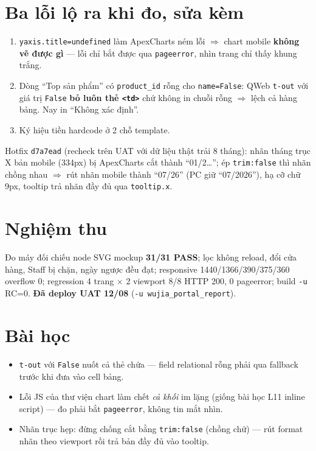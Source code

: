 \section{Ba lỗi lộ ra khi đo, sửa kèm}

\begin{enumerate}
\item \texttt{yaxis.title=undefined} làm ApexCharts ném lỗi $\Rightarrow$ chart mobile
  \textbf{không vẽ được gì} --- lỗi chỉ bắt được qua \texttt{pageerror}, nhìn trang chỉ thấy
  khung trắng.
\item Dòng ``Top sản phẩm'' có \texttt{product\_id} rỗng cho \texttt{name=False}: QWeb
  \texttt{t-out} với giá trị \texttt{False} \textbf{bỏ luôn thẻ \texttt{<td>}} chứ không in
  chuỗi rỗng $\Rightarrow$ lệch cả hàng bảng. Nay in ``Không xác định''.
\item Ký hiệu tiền hardcode ở 2 chỗ template.
\end{enumerate}

Hotfix \texttt{d7a7ead} (recheck trên UAT với dữ liệu thật trải 8 tháng): nhãn tháng trục X
bản mobile (334px) bị ApexCharts cắt thành ``01/2\ldots''; ép \texttt{trim:false} thì nhãn
chồng nhau $\Rightarrow$ rút nhãn mobile thành ``07/26'' (PC giữ ``07/2026''), hạ cỡ chữ 9px,
tooltip trả nhãn đầy đủ qua \texttt{tooltip.x}.

\section{Nghiệm thu}

Đo máy đối chiếu node SVG mockup \textbf{31/31 PASS}; lọc không reload, đổi cửa hàng, Staff bị
chặn, ngày ngược đều đạt; responsive 1440/1366/390/375/360 overflow 0; regression 4 trang
$\times$ 2 viewport 8/8 HTTP 200, 0 pageerror; build \texttt{-u} RC=0. \textbf{Đã deploy UAT
12/08} (\texttt{-u wujia\_portal\_report}).

\section{Bài học}

\begin{itemize}
\item \texttt{t-out} với \texttt{False} nuốt cả thẻ chứa --- field relational rỗng phải qua
  fallback trước khi đưa vào cell bảng.
\item Lỗi JS của thư viện chart làm chết \emph{cả khối} im lặng (giống bài học L11 inline
  script) --- đo phải bắt \texttt{pageerror}, không tin mắt nhìn.
\item Nhãn trục hẹp: đừng chống cắt bằng \texttt{trim:false} (chồng chữ) --- rút format nhãn
  theo viewport rồi trả bản đầy đủ vào tooltip.
\end{itemize}
